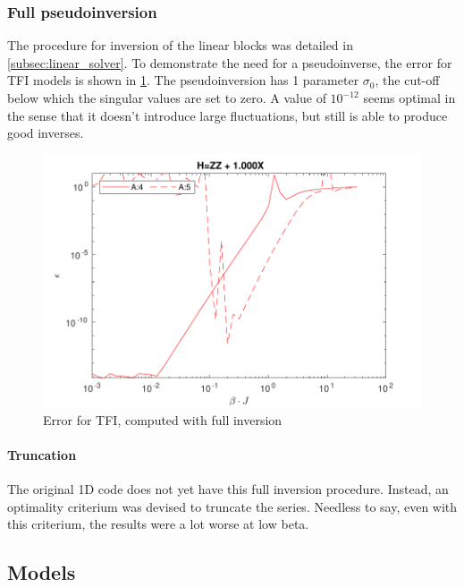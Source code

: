 \subsubsection{Full pseudoinversion}

The procedure for inversion of the linear blocks was detailed in \cref{subsec:linear_solver}. To demonstrate the need for a pseudoinverse, the error for \Gls{TFI} models is shown in \cref{benc:fig:fullinv}. The pseudoinversion has 1 parameter $\sigma_0$, the cut-off below which the singular values are set to zero. A value of $10^{-12}$ seems optimal in the sense that it doesn't introduce large fluctuations, but still is able to produce good inverses.

\begin{figure}[!htbp]
    \center
    \includegraphics[width=\textwidth]{Figuren/benchmarking/t_ising_full_inverse.pdf }
    \caption{Error for \Gls{TFI}, computed with full inversion }
    \label{benc:fig:fullinv}
\end{figure}

\paragraph{Truncation}

The original 1D code does not yet have this full inversion procedure. Instead, an optimality criterium was devised to truncate the series. Needless to say, even with this criterium, the results were a lot worse at low beta.

\subsection{Models}

